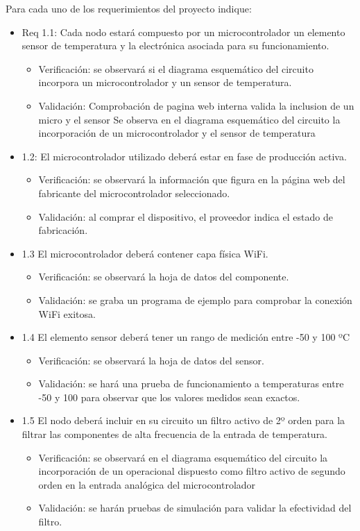 \documentclass[11pt]{charter}
\begin{document}
Para cada uno de los requerimientos del proyecto indique:
\begin{itemize} 
\item Req 1.1: Cada nodo estará compuesto por un microcontrolador un elemento sensor de
temperatura y la electrónica asociada para su funcionamiento.
	\begin{itemize}
	\item Verificación: se observará si el diagrama esquemático del circuito incorpora un microcontrolador y un sensor de temperatura.
	\item Validación: Comprobación de pagina web interna valida la inclusion de un micro y el sensor
	Se observa en el diagrama esquemático del circuito la incorporación de un microcontrolador y el sensor de temperatura
\end{itemize}

\item 1.2: El microcontrolador utilizado deberá estar en fase de producción activa.
\begin{itemize}
\item Verificación: se observará la información que figura en la página web del fabricante del microcontrolador seleccionado.
\item Validación: al comprar el dispositivo, el proveedor indica el estado de fabricación.
\end{itemize}

\item 1.3 El microcontrolador deberá contener capa física WiFi.

\begin{itemize}
\item Verificación: se observará la hoja de datos del componente.
\item Validación: se graba un programa de ejemplo para comprobar la conexión WiFi exitosa.
\end{itemize}


\item 1.4 El elemento sensor deberá tener un rango de medición entre -50 y 100 ºC
\begin{itemize}
\item Verificación: se observará la hoja de datos del sensor.
\item Validación: se hará una prueba de funcionamiento a temperaturas entre -50 y 100 para observar que los valores medidos sean exactos.
\end{itemize}


\item 1.5 El nodo deberá incluir en su circuito un filtro activo de 2º orden para la filtrar las componentes de alta frecuencia de la entrada de temperatura.
\begin{itemize}
\item Verificación: se observará en el diagrama esquemático del circuito la incorporación de un operacional dispuesto como filtro activo de segundo orden en la entrada analógica del microcontrolador
\item Validación: se harán pruebas de simulación para validar la efectividad del filtro.
\end{itemize}


\end{itemize}
\end{document}
